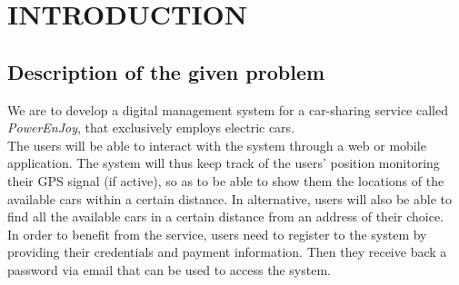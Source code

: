 \section{INTRODUCTION}
\subsection{Description of the given problem}
We are to develop a digital management system for a car-sharing service called \textsl{PowerEnJoy}, that exclusively employs electric cars. \\
The users will be able to interact with the system through a web or mobile application. The system will thus keep track of the users' position monitoring their GPS signal (if active), so as to be able to show them the locations of the available cars within a certain distance. In alternative, users will also be able to find all the available cars in a certain distance from an address of their choice.\\
In order to benefit from the service, users need to register to the system by providing their credentials and payment information. Then they receive back a password via email that can be used to access the system. 

\newpage
